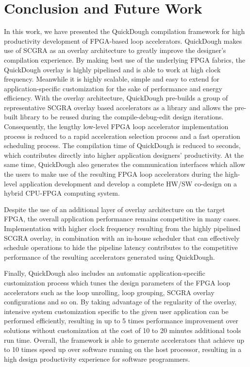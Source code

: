\chapter{Conclusion and Future Work} \label{chapter:conclusion}
In this work, we have presented the QuickDough compilation framework for high productivity development of FPGA-based loop accelerators. QuickDough makes use of SCGRA as an overlay architecture to greatly improve the designer's compilation experience. By making best use of the underlying FPGA fabrics, the QuickDough overlay is highly pipelined and is able to work at high clock frequency. Meanwhile it is highly scalable, simple and easy to extend for application-specific customization for the sake of performance and energy efficiency. With the overlay architecture, QuickDough pre-builds a group of representative SCGRA overlay based accelerators as a library and allows the pre-built library to be reused during the compile-debug-edit design iterations. Consequently, the lengthy low-level FPGA loop accelerator implementation process is reduced to a rapid acceleration selection process and a fast operation scheduling process. The compilation time of QuickDough is reduced to seconds, which contributes directly into higher application designers' productivity. At the same time, QuickDough also generates the communication interfaces which allow the users to make use of the resulting FPGA loop accelerators during the high-level application development and develop a complete HW/SW co-design on a hybrid CPU-FPGA computing system. 

Despite the use of an additional layer of overlay architecture on the target FPGA, the overall application performance remains competitive in many cases. Implementation with higher clock frequency resulting from the highly pipelined SCGRA overlay, in combination with an in-house scheduler that can effectively schedule operations to hide the pipeline latency contributes to the competitive performance of the resulting accelerators generated using QuickDough.

Finally, QuickDough also includes an automatic application-specific customization process which tunes the design parameters of the FPGA loop accelerators such as the loop unrolling, loop grouping, SCGRA overlay configurations and so on. By taking advantage of the regularity of the overlay, intensive system customization specific to the given user application can be performed efficiently, resulting in up to \num{5} times performance improvement over solutions without customization at the cost of \num{10} to \num{20} minutes additional tools run time. Overall, the framework is able to generate accelerators that achieve up to \num{10} times speed up over software running on the host processor, resulting in a high design productivity experience for software programmers.
  
